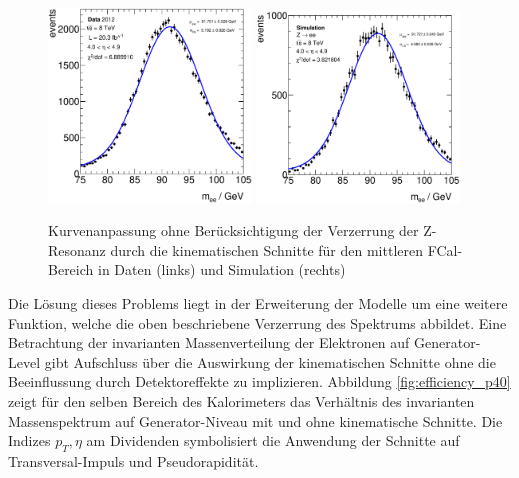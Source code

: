 \begin{figure}
    \centering
    \includegraphics[width=0.48\textwidth]{plots/bad_fit_data_p40}
    \hfill
    \includegraphics[width=0.48\textwidth]{plots/bad_fit_mc_p40}
    \caption[Kurvenanpassung ohne Berücksichtigung der Verzerrung der
        Z-Resonanz durch die kinematischen Schnitte]
        {Kurvenanpassung ohne Berücksichtigung der Verzerrung der Z-Resonanz
        durch die kinematischen Schnitte für den mittleren \acs{FCal}-Bereich
        in Daten (links) und Simulation (rechts)}
    \label{fig:example_fits}
\end{figure}

Die Lösung dieses Problems liegt in der Erweiterung der Modelle um eine weitere
Funktion, welche die oben beschriebene Verzerrung des Spektrums abbildet. Eine
Betrachtung der invarianten Massenverteilung der Elektronen auf Generator-Level
gibt Aufschluss über die Auswirkung der kinematischen Schnitte ohne die
Beeinflussung durch Detektoreffekte zu implizieren. Abbildung
\ref{fig:efficiency_p40} zeigt für den selben Bereich des Kalorimeters das
Verhältnis des invarianten Massenspektrum auf Generator-Niveau mit und ohne
kinematische Schnitte. Die Indizes $p_T,\eta$ am Dividenden symbolisiert die
Anwendung der Schnitte auf Transversal-Impuls und Pseudorapidität.

